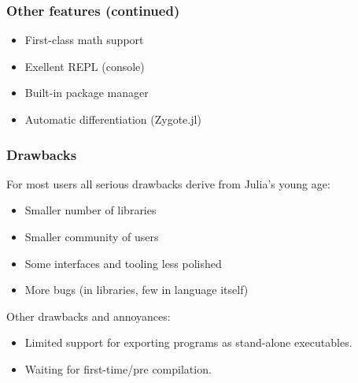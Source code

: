 \documentclass[t]{beamer}
\begin{document}
\begin{frame}
  \frametitle{Other features (continued)}
  \begin{itemize}
  \item First-class math support
    \item Exellent REPL (console)
    \item Built-in package manager
    \item Automatic differentiation (Zygote.jl)
  \end{itemize}
\end{frame}

\begin{frame}
  \frametitle{Drawbacks}
  For most users all serious drawbacks derive from Julia's young age:
  \begin{itemize}
     \item Smaller number of libraries
     \item Smaller community of users
     \item Some interfaces and tooling less polished
     \item More bugs (in libraries, few in language itself)
  \end{itemize}
  Other drawbacks and annoyances:
  \begin{itemize}
     \item Limited support for exporting programs as stand-alone executables.
     \item Waiting for first-time/pre compilation.
  \end{itemize}
\end{frame}
\end{document}
